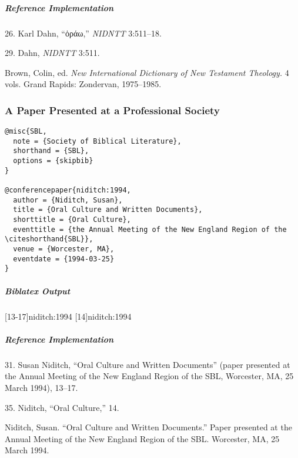\documentclass[a4paper]{article}
\newcommand{\textgreek}[1]{{\greekfont #1}}
\newenvironment{biboutput}{%
  \subparagraph{Biblatex Output}
}{\color{black}}
\newenvironment{refimp}{%
  \subparagraph{Reference Implementation}
  \color{reference-colour}
  \rm
}{\par\color{black}}
\begin{document}
\begin{refimp}
  \hspace*{\bibindent}26. Karl Dahn, “\textgreek{ὁράω},” \emph{NIDNTT} 3:511–18.

  \hspace*{\bibindent}29. Dahn, \emph{NIDNTT} 3:511.

  \hangindent\bibindent Brown, Colin, ed. \emph{New International Dictionary
  of New Testament Theology.} 4 vols. Grand Rapids: Zondervan, 1975–1985.

\end{refimp}

\subsubsection{A Paper Presented at a Professional Society}

\begin{lstlisting}
@misc{SBL,
  note = {Society of Biblical Literature},
  shorthand = {SBL},
  options = {skipbib}
}

@conferencepaper{niditch:1994,
  author = {Niditch, Susan},
  title = {Oral Culture and Written Documents},
  shorttitle = {Oral Culture},
  eventtitle = {the Annual Meeting of the New England Region of the \citeshorthand{SBL}},
  venue = {Worcester, MA},
  eventdate = {1994-03-25}
}
\end{lstlisting}

\begin{biboutput}
  [13-17]{niditch:1994}
  [14]{niditch:1994}
\end{biboutput}

\begin{refimp}
  \hspace*{\bibindent}31. Susan Niditch, “Oral Culture and Written Documents”
  (paper presented at the Annual Meeting of the New England Region of the SBL,
  Worcester, MA, 25 March 1994), 13–17.

  \hspace*{\bibindent}35. Niditch, “Oral Culture,” 14.

  \hangindent\bibindent Niditch, Susan. “Oral Culture and Written Documents.”
  Paper presented at the Annual Meeting of the New England Region of the SBL.
  Worcester, MA, 25 March 1994.

\end{refimp}
\end{document}
